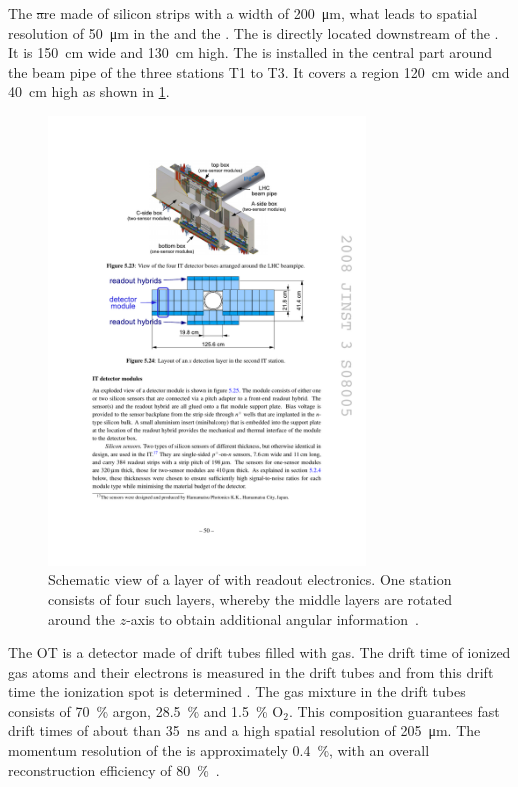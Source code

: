 The \st are made of silicon strips with a width of \SI{200}{\micro\metre}, what leads to spatial resolution of \SI{50}{\micro\metre} in the \intr and the \ttracker.
The \ttracker is directly located downstream of the \richone.
It is \SI{150}{\centi\metre} wide and \SI{130}{\centi\metre} high.
The \intr is installed in the central part around the beam pipe of the three stations T1 to T3.
It covers a region \SI{120}{\centi\metre} wide and \SI{40}{\centi\metre} high as shown in \cref{fig:InnerTracker}.
\begin{figure}[tbp]
    \centering
    \includegraphics[width=0.75\textwidth]{05lhcb/figs/IT.pdf}
    \caption{Schematic view of a layer of \intr with readout electronics.
    One station consists of four such layers, whereby the middle layers are rotated around the $z$-axis to obtain additional angular information~\cite{Alves:2008zz}.}
    \label{fig:InnerTracker}
\end{figure}

The OT is a detector made of drift tubes filled with gas.
The drift time of ionized gas atoms and their electrons is measured in the drift tubes and from this drift time the ionization spot is determined .
The gas mixture in the drift tubes consists of \SI{70}{\percent} argon, \SI{28.5}{\percent} \cotwo and \SI{1.5}{\percent} $\mathrm O_2$.
This composition guarantees fast drift times of about than \SI{35}{\nano\second} and a high spatial resolution of \SI{205}{\micro\metre}.
The momentum resolution of the \ot is approximately \SI{0.4}{\percent}, with an overall reconstruction efficiency of \SI{80}{\percent}~\cite{Alves:2008zz}.

